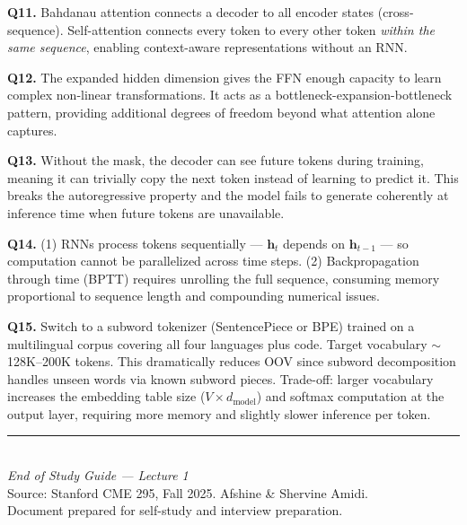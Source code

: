 \documentclass[11pt, a4paper]{article}
\begin{document}
\textbf{Q11.} Bahdanau attention connects a decoder to all encoder states (cross-sequence). Self-attention connects every token to every other token \emph{within the same sequence}, enabling context-aware representations without an RNN.

\textbf{Q12.} The expanded hidden dimension gives the FFN enough capacity to learn complex non-linear transformations. It acts as a bottleneck-expansion-bottleneck pattern, providing additional degrees of freedom beyond what attention alone captures.

\textbf{Q13.} Without the mask, the decoder can see future tokens during training, meaning it can trivially copy the next token instead of learning to predict it. This breaks the autoregressive property and the model fails to generate coherently at inference time when future tokens are unavailable.

\textbf{Q14.} (1) RNNs process tokens sequentially --- $\mathbf{h}_t$ depends on $\mathbf{h}_{t-1}$ --- so computation cannot be parallelized across time steps. (2) Backpropagation through time (BPTT) requires unrolling the full sequence, consuming memory proportional to sequence length and compounding numerical issues.

\textbf{Q15.} Switch to a subword tokenizer (SentencePiece or BPE) trained on a multilingual corpus covering all four languages plus code. Target vocabulary $\sim$128K--200K tokens. This dramatically reduces OOV since subword decomposition handles unseen words via known subword pieces. Trade-off: larger vocabulary increases the embedding table size ($V \times d_{\text{model}}$) and softmax computation at the output layer, requiring more memory and slightly slower inference per token.

\vspace{1em}
\begin{center}
\rule{0.5\textwidth}{0.4pt}\\[6pt]
{\small\textit{End of Study Guide --- Lecture 1}}\\[4pt]
{\small Source: Stanford CME 295, Fall 2025. Afshine \& Shervine Amidi.}\\
{\small Document prepared for self-study and interview preparation.}
\end{center}
\end{document}

